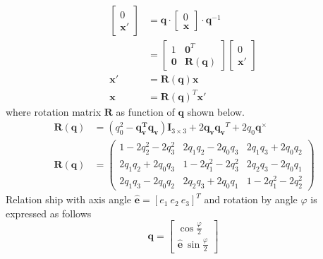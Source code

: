 \begin{equation*}
\begin{aligned}
\begin{bmatrix}
0\\
\mathbf{x} '
\end{bmatrix} & =\mathbf{q} \cdot \begin{bmatrix}
0\\
\mathbf{x}
\end{bmatrix} \cdot \mathbf{q}^{-1}\\
 & =\begin{bmatrix}
1 & \mathbf{0}^{T}\\
\mathbf{0} & \mathbf{R}(\mathbf{q})
\end{bmatrix}\begin{bmatrix}
0\\
\mathbf{x} '
\end{bmatrix}\\
\mathbf{x} ' & =\mathbf{R}(\mathbf{q})\mathbf{x}\\
\mathbf{x} & =\mathbf{R}(\mathbf{q})^{T}\mathbf{x} '
\end{aligned}
\end{equation*}
where rotation matrix $\displaystyle \mathbf{R}$ as function of $\displaystyle \mathbf{q}$ shown below.
\begin{equation}
\ \begin{aligned}
\mathbf{R}(\mathbf{q}) & =\left( q^{2}_{0} -\mathbf{q_v ^{T} q_v}\right)\mathbf{I}_{3\times 3} +2\mathbf{q_v q_v}^{T} +2q_{0}\mathbf{q}^{\times }\\
\mathbf{R}(\mathbf{q}) & =\begin{pmatrix}
1-2q^{2}_{2} -2q^{2}_{3} & 2q_{1} q_{2} -2q_{0} q_{3} & 2q_{1} q_{3} +2q_{0} q_{2}\\
2q_{1} q_{2} +2q_{0} q_{3} & 1-2q^{2}_{1} -2q^{2}_{3} & 2q_{2} q_{3} -2q_{0} q_{1}\\
2q_{1} q_{3} -2q_{0} q_{2} & 2q_{2} q_{3} +2q_{0} q_{1} & 1-2q^{2}_{1} -2q^{2}_{2}
\end{pmatrix}
\end{aligned}
\end{equation}
Relation ship with axis angle $\displaystyle \hat{\mathbf{e}} =[ e_{1} \ e_{2} \ e_{3}]^{T}$ and rotation by angle $\displaystyle \varphi $ is expressed as follows
\begin{equation}
\label{eqn:axisAngle}
\mathbf{q} =\begin{bmatrix}
\cos\frac{\varphi }{2}\\
\hat{\mathbf{e}} \ \sin\frac{\varphi }{2}
\end{bmatrix}
\end{equation}
